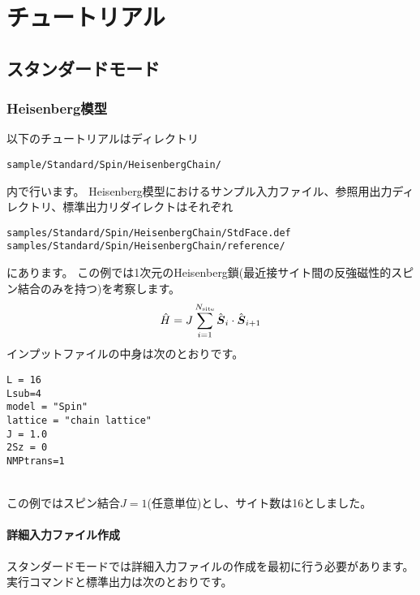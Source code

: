 \chapter{チュートリアル}
\label{Ch:model}
\section{スタンダードモード}
\label{Sec:StandardMode}

\subsection{Heisenberg模型}

以下のチュートリアルはディレクトリ
\begin{verbatim}
sample/Standard/Spin/HeisenbergChain/
\end{verbatim}
内で行います。
Heisenberg模型におけるサンプル入力ファイル、参照用出力ディレクトリ、標準出力リダイレクトはそれぞれ
\begin{verbatim}
samples/Standard/Spin/HeisenbergChain/StdFace.def
samples/Standard/Spin/HeisenbergChain/reference/
\end{verbatim}
にあります。
この例では1次元のHeisenberg鎖(最近接サイト間の反強磁性的スピン結合のみを持つ)を考察します。
\begin{align}
  {\hat H} = J \sum_{i=1}^{N_{\rm site}} {\hat {\boldsymbol S}}_i \cdot {\hat {\boldsymbol S}}_{i+1}
\end{align}
インプットファイルの中身は次のとおりです。
\\
\begin{minipage}{10cm}
\begin{screen}
\begin{verbatim}
L = 16
Lsub=4
model = "Spin"
lattice = "chain lattice"
J = 1.0
2Sz = 0
NMPtrans=1
\end{verbatim}
\end{screen}
\end{minipage}
%
\\
この例ではスピン結合$J=1$(任意単位)とし、サイト数は16としました。

\subsubsection{詳細入力ファイル作成}
スタンダードモードでは詳細入力ファイルの作成を最初に行う必要があります。
実行コマンドと標準出力は次のとおりです。

